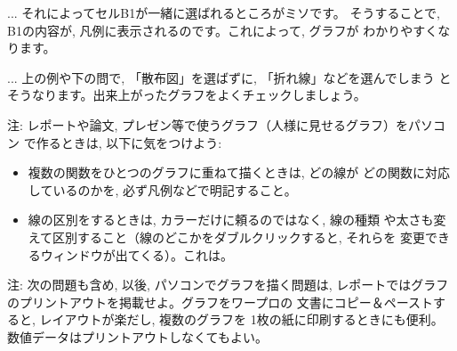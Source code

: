\begin{faq}{\small{} ... それによってセルB1が一緒に選ばれるところがミソです。
そうすることで, B1の内容が, 凡例に表示されるのです。これによって, グラフが
わかりやすくなります。}\end{faq}

\begin{freqmiss}{\small{} ... 上の例や下の問で, 「散布図」を選ばずに, 「折れ線」などを選んでしまう
とそうなります。出来上がったグラフをよくチェックしましょう。}\end{freqmiss}

{\small 注: レポートや論文, プレゼン等で使うグラフ（人様に見せるグラフ）をパソコン
で作るときは, 以下に気をつけよう:
\begin{itemize}
\item 複数の関数をひとつのグラフに重ねて描くときは, どの線が
どの関数に対応しているのかを, 必ず凡例などで明記すること。
\item 線の区別をするときは, カラーだけに頼るのではなく, 線の種類
や太さも変えて区別すること（線のどこかをダブルクリックすると, それらを
変更できるウィンドウが出てくる）。これは。
\end{itemize}}


{\small 注: 次の問題も含め, 以後, パソコンでグラフを描く問題は, 
レポートではグラフのプリントアウトを掲載せよ。グラフをワープロの
文書にコピー＆ペーストすると, レイアウトが楽だし, 複数のグラフを
1枚の紙に印刷するときにも便利。数値データはプリントアウトしなくてもよい。}


